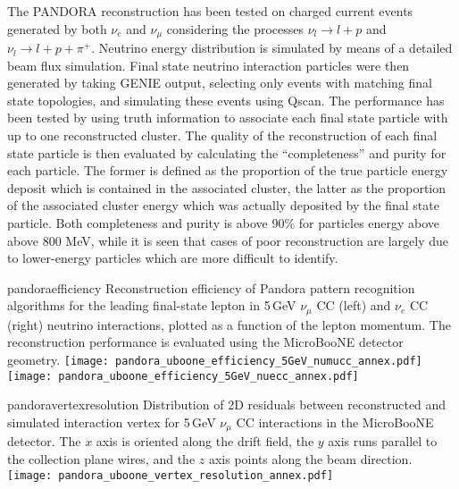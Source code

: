 The PANDORA reconstruction has been tested on charged current events generated by both   $\nu_{e}$  and $\nu_{\mu}$  
considering the processes $\nu_{l}\to l+p$  and $\nu_{l}\to l+p+\pi^{+}$.
Neutrino energy distribution is simulated by means of a detailed beam flux simulation.
Final state neutrino interaction particles were then generated by taking GENIE output, selecting only events with matching final state topologies, 
and simulating these events using Qscan.
 The performance has been tested by using truth information to associate each final state particle with up to one reconstructed cluster.
The quality of the reconstruction of each final state particle is then evaluated by calculating the ``completeness'' and purity for each particle.
The former is defined as the proportion of the true particle energy deposit which 
is contained in the associated cluster, the latter as  the proportion of the associated cluster energy which was actually deposited by the final state particle.
Both completeness and purity is above 90$\%$ for particles energy above above 800 MeV, while
it is seen that cases of poor reconstruction are largely due to lower-energy particles which are more difficult to identify.



\begin{cdrfigure}{pandoraefficiency}
{Reconstruction efficiency of Pandora pattern recognition algorithms
 for the leading final-state lepton in 5\,GeV $\nu_{\mu}$ CC (left) and
 $\nu_{e}$ CC (right) neutrino interactions, plotted as a function of
 the lepton momentum. The reconstruction performance is evaluated
 using the MicroBooNE detector geometry. }
\texttt{[image: pandora\_uboone\_efficiency\_5GeV\_numucc\_annex.pdf]}
\texttt{[image: pandora\_uboone\_efficiency\_5GeV\_nuecc\_annex.pdf]}
\end{cdrfigure}

\begin{cdrfigure}{pandoravertexresolution}
{Distribution of 2D residuals between reconstructed and simulated interaction
 vertex for 5\,GeV $\nu_{\mu}$ CC interactions in the MicroBooNE detector.
 The $x$ axis is oriented along the drift field, the $y$ axis runs parallel 
 to the collection plane wires, and the $z$ axis points along the beam direction.}
\texttt{[image: pandora\_uboone\_vertex\_resolution\_annex.pdf]}
\end{cdrfigure}


